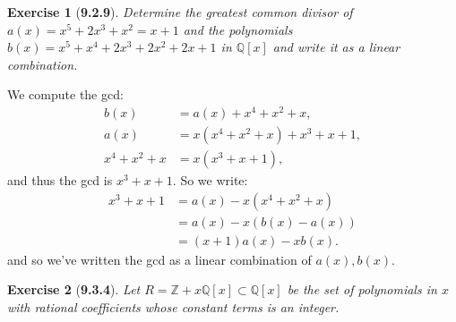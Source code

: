 \documentclass[10pt,oneside,reqno]{amsart}
\theoremstyle{plain}
\newtheorem*{e}{Exercise}
\theoremstyle{definition}
\begin{document}
\begin{e}[\textbf{9.2.9}]
Determine the greatest common divisor of $a(x) = x^5 + 2x^3 + x^2 = x + 1$ and the polynomials $b(x) = x^5 + x^4 + 2x^3 + 2x^2 + 2x + 1$ in $\mathbb{Q}[x]$ and write it as a linear combination. 
\end{e}
We compute the gcd:
\begin{equation}
\begin{aligned}
b(x) &= a(x) + x^4 + x^2 + x,\\
a(x) &= x(x^4 + x^2 + x) + x^3 + x + 1,\\
x^4 + x^2 + x &= x( x^3 + x + 1),
\end{aligned}
\end{equation}
and thus the gcd is $ x^3 + x + 1$. So we write:
\begin{equation}
\begin{aligned}
x^3 + x + 1 &= a(x) - x(x^4 + x^2 + x)\\
&= a(x) - x(b(x) - a(x))\\
&= (x + 1)a(x) - xb(x).
\end{aligned}
\end{equation}
and so we've written the gcd as a linear combination of $a(x),b(x)$. \\

\begin{e}[\textbf{9.3.4}]
Let $R = \mathbb{Z} + x\mathbb{Q}[x] \subset \mathbb{Q}[x]$ be the set of polynomials in $x$ with rational coefficients whose constant terms is an integer. 
\end{e}
\end{document}
